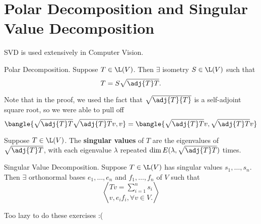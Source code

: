 \section{Polar Decomposition and Singular Value Decomposition}

SVD is used extensively in Computer Vision.

\begin{theorem}
  Polar Decomposition. Suppose $T \in \L(V)$. Then $\exists$ isometry $S \in \L(V)$ such that
  \begin{equation}
    T = S \sqrt{\adj{T}T}.
  \end{equation}
\end{theorem}

Note that in the proof, we used the fact that $\sqrt{\adj{T}{T}}$ is a self-adjoint square root, so we were able to pull off
\begin{equation*}
  \bangle{
    \sqrt{\adj{T}T}\sqrt{\adj{T}T}v, v
  }
  = \bangle{
    \sqrt{\adj{T}T}v, \sqrt{\adj{T}T}v
  }
\end{equation*}

\begin{definition}
  Suppose $T \in \L(V)$. The \textbf{singular values} of $T$ are the eigenvalues of $\sqrt{\adj{T}T}$, with each eigenvalue $\lambda$ repeated $\dim E(\lambda, \sqrt{\adj{T}T})$ times.
\end{definition}

\begin{theorem}
  Singular Value Decomposition. Suppose $T \in \L(V)$ has singular values $s_1, \dots, s_n$. Then $\exists$ orthonormal bases $e_1, \dots, e_n$ and $f_1, \dots, f_n$ of $V$ such that
  \begin{equation}
    Tv = \sum_{i=1}^n s_i\bangle{v, e_i}f_i, \forall v \in V.
  \end{equation}
\end{theorem}

Too lazy to do these exercises :(